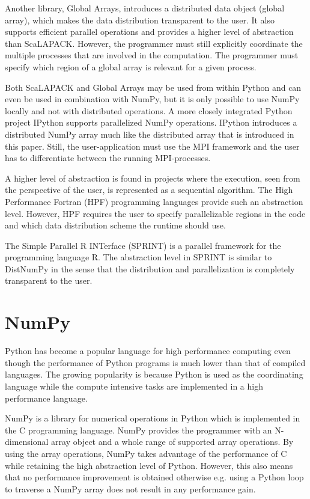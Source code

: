 \documentclass[10pt]{article}
\begin{document}
Another library, Global Arrays\cite{Nieplocha96}, introduces a distributed data object (global array), which makes the data distribution transparent to the user. It also supports efficient parallel operations and provides a higher level of abstraction than ScaLAPACK. However, the programmer must still explicitly coordinate the multiple processes that are involved in the computation. The programmer must specify which region of a global array is relevant for a given process.

Both ScaLAPACK and Global Arrays may be used from within Python and can even be used in combination with NumPy, but it is only possible to use NumPy locally and not with distributed operations. A more closely integrated Python project IPython\cite{PER-GRA:2007} supports parallelized NumPy operations. IPython introduces a distributed NumPy array much like the distributed array that is introduced in this paper. Still, the user-application must use the MPI framework and the user has to differentiate between the running MPI-processes.

A higher level of abstraction is found in projects where the execution, seen from the perspective of the user, is represented as a sequential algorithm. The High Performance Fortran (HPF)\cite{Loveman93} programming languages provide such an abstraction level. However, HPF requires the user to specify parallelizable regions in the code and which data distribution scheme the runtime should use. 

The Simple Parallel R INTerface (SPRINT)\cite{Hill08} is a parallel framework for the programming language R. The abstraction level in SPRINT is similar to DistNumPy in the sense that the distribution and parallelization is completely transparent to the user.

\section{NumPy}
Python has become a popular language for high performance computing even though the performance of Python programs is much lower than that of compiled languages. The growing popularity is because Python is used as the coordinating language while the compute intensive tasks are implemented in a high performance language.

NumPy\cite{numpy} is a library for numerical operations in Python which is implemented in the C programming language. NumPy provides the programmer with an N-dimensional array object and a whole range of supported array operations. By using the array operations, NumPy takes advantage of the performance of C while retaining the high abstraction level of Python. However, this also means that no performance improvement is obtained otherwise e.g. using a Python loop to traverse a NumPy array does not result in any performance gain. 
\end{document}
